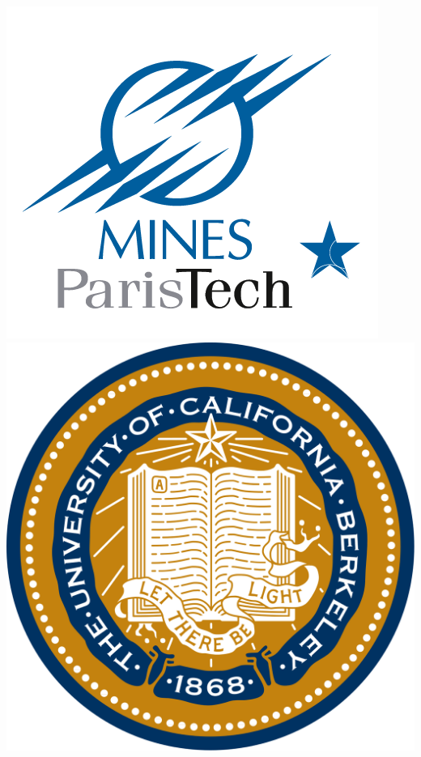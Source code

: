 \documentclass[11pt,xcolor=dvipsnames]{beamer}
\begin{document}
\begin{frame}
\begin{columns}
\begin{column}{0.08\linewidth}
\includegraphics[width=0.9\linewidth]{images/ecole_des_mines.png} \\
\vspace{15pt}
\includegraphics[width=0.9\linewidth]{images/uc_berkeley.png} \\
\vspace{15pt}

\end{column}
\end{columns}
\end{frame}
\end{document}
